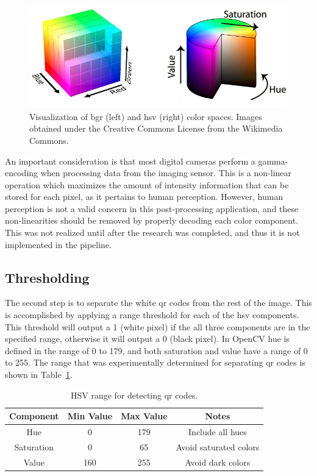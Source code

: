 \begin{figure}
	\centering
    \includegraphics[width=5.5in]{figures/bgr_and_hsv.jpg}
    \caption[BGR and HSV color spaces]{Visualization of \ac{bgr} (left) and \ac{hsv} (right) color spaces. Images obtained under the Creative Commons License from the Wikimedia Commons.}
    \label{figure:color_spaces}
\end{figure} 

An important consideration is that most digital cameras perform a gamma-encoding when processing data from the imaging sensor.  This is a non-linear operation which maximizes the amount of intensity information that can be stored for each pixel, as it pertains to human perception.  However, human perception is not a valid concern in this post-processing application, and these non-linearities should be removed by properly decoding each color component.  This was not realized until after the research was completed, and thus it is not implemented in the pipeline.

\subsection{Thresholding}
\label{section:qr_thresholding}

The second step is to separate the white \ac{qr} codes from the rest of the image.  This is accomplished by applying a range threshold for each of the \ac{hsv} components.  This threshold will output a 1 (white pixel) if the all three components are in the specified range, otherwise it will output a 0 (black pixel).  In OpenCV hue is defined in the range of 0 to 179, and both saturation and value have a range of 0 to 255.  The range that was experimentally determined for separating \ac{qr} codes is shown in Table~\ref{table:qr_hsv_ranges}.

\begin{table}
    \begin{center}
    \caption[QR code detection values]{HSV range for detecting \ac{qr} codes.}
    \begin{tabular}[c]{|c|c|c|c|}
        \hline
        Component & Min Value & Max Value & Notes \\
        \hline
        Hue        & 0   & 179 & Include all hues      \\
        Saturation & 0   & 65  & Avoid saturated colors  \\
        Value      & 160 & 255 & Avoid dark colors       \\
        \hline
    \end{tabular}
    \label{table:qr_hsv_ranges}
   \end{center}
\end{table}

